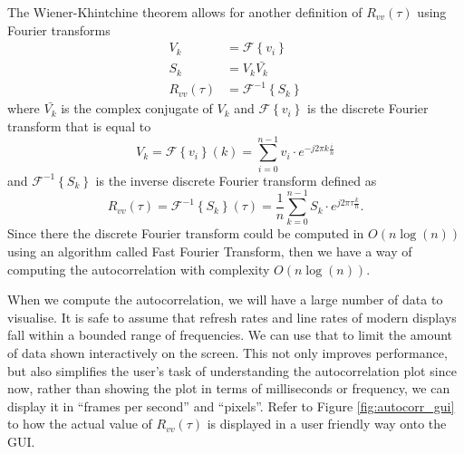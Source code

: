 \documentclass[a4paper,12pt,twoside,openright]{report}
\begin{document}
The Wiener-Khintchine theorem \cite{wiener1964} allows for another definition of $R_{vv}(\tau)$ using Fourier transforms
\begin{equation}
	\begin{aligned}
	V_{k} & = \mathcal{F} \left\{ v_{i} \right\} \\
	S_{k} & = V_{k} \bar{V_{k}} \\
	R_{vv}(\tau) & = \mathcal{F}^{-1} \left\{ S_{k} \right\}
	\end{aligned}
\end{equation}
where $\bar{V_{k}}$ is the complex conjugate of $V_{k}$ and $\mathcal{F} \left\{ v_{i} \right\}$ is the discrete Fourier transform that is equal to
$$V_{k}=\mathcal{F} \left\{ v_{i} \right\} (k) = \sum_{i = 0}^{n-1} v_{i} \cdot e^{- j 2 \pi k \frac{i}{n}} $$
and $\mathcal{F}^{-1} \left\{ S_{k} \right\}$ is the inverse discrete Fourier transform defined as
$$R_{vv}(\tau)=\mathcal{F}^{-1} \left\{ S_{k} \right\} (\tau) = \frac{1}{n} \sum_{k = 0}^{n-1} S_{k} \cdot e^{j 2 \pi \tau \frac{k}{n}}. $$
Since there the discrete Fourier transform could be computed in $O(n \log(n))$ using an algorithm called Fast Fourier Transform, then we have a way of computing the autocorrelation with complexity $O(n \log(n))$.

When we compute the autocorrelation, we will have a large number of data to visualise. It is safe to assume that refresh rates and line rates of modern displays fall within a bounded range of frequencies. We can use that to limit the amount of data shown interactively on the screen. This not only improves performance, but also simplifies the user's task of understanding the autocorrelation plot since now, rather than showing the plot in terms of milliseconds or frequency, we can display it in ``frames per second'' and ``pixels''. Refer to Figure \ref{fig:autocorr_gui} to how the actual value of $R_{vv}(\tau)$ is displayed in a user friendly way onto the GUI.
\end{document}
